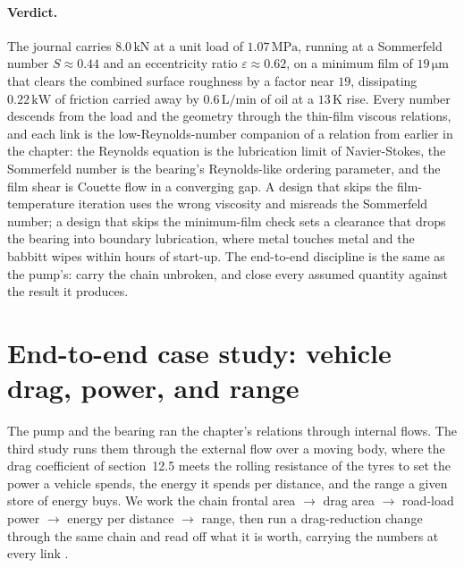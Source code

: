 

\paragraph{Verdict.} The journal carries $8.0\,\text{kN}$ at a unit
load of $1.07\,\text{MPa}$, running at a Sommerfeld number $S\approx
0.44$ and an eccentricity ratio $\varepsilon\approx0.62$, on a minimum
film of $19\,\si{\micro\meter}$ that clears the combined surface
roughness by a factor near $19$, dissipating $0.22\,\text{kW}$ of
friction carried away by $0.6\,\text{L/min}$ of oil at a $13\,\si{
\kelvin}$ rise. Every number descends from the load and the geometry
through the thin-film viscous relations, and each link is the
low-Reynolds-number companion of a relation from earlier in the
chapter: the Reynolds equation is the lubrication limit of
Navier-Stokes, the Sommerfeld number is the bearing's Reynolds-like
ordering parameter, and the film shear is Couette flow in a converging
gap. A design that skips the film-temperature iteration uses the wrong
viscosity and misreads the Sommerfeld number; a design that skips the
minimum-film check sets a clearance that drops the bearing into
boundary lubrication, where metal touches metal and the babbitt wipes
within hours of start-up. The end-to-end discipline is the same as the
pump's: carry the chain unbroken, and close every assumed quantity
against the result it produces.

\section{End-to-end case study: vehicle drag, power, and range}

The pump and the bearing ran the chapter's relations through internal
flows. The third study runs them through the external flow over a
moving body, where the drag coefficient of section~12.5 meets the
rolling resistance of the tyres to set the power a vehicle spends, the
energy it spends per distance, and the range a given store of energy
buys. We work the chain frontal area $\to$ drag area $\to$ road-load
power $\to$ energy per distance $\to$ range, then run a drag-reduction
change through the same chain and read off what it is worth, carrying
the numbers at every link \cite{text:white-fluid-mechanics,
text:anderson-aerodynamics}.

